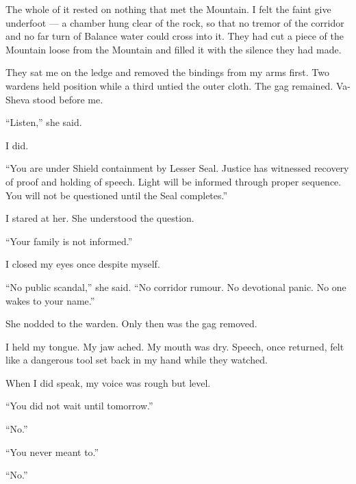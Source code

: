 The whole of it rested on nothing that met the Mountain. I felt the faint give underfoot --- a chamber hung clear of the rock, so that no tremor of the corridor and no far turn of Balance water could cross into it. They had cut a piece of the Mountain loose from the Mountain and filled it with the silence they had made.\par

They sat me on the ledge and removed the bindings from my arms first. Two wardens held position while a third untied the outer cloth. The gag remained. Va-Sheva stood before me.\par

``Listen,'' she said.\par

I did.\par

``You are under Shield containment by Lesser Seal. Justice has witnessed recovery of proof and holding of speech. Light will be informed through proper sequence. You will not be questioned until the Seal completes.''\par

I stared at her. She understood the question.\par

``Your family is not informed.''\par

I closed my eyes once despite myself.\par

``No public scandal,'' she said. ``No corridor rumour. No devotional panic. No one wakes to your name.''\par

She nodded to the warden. Only then was the gag removed.\par

I held my tongue. My jaw ached. My mouth was dry. Speech, once returned, felt like a dangerous tool set back in my hand while they watched.\par

When I did speak, my voice was rough but level.\par

``You did not wait until tomorrow.''\par

``No.''\par

``You never meant to.''\par

``No.''\par

